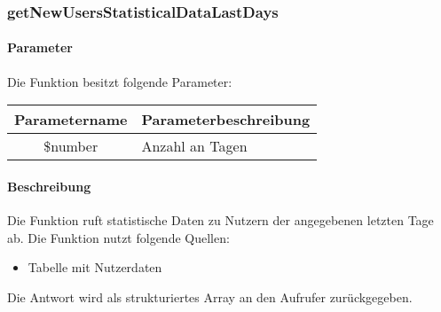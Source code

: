 \subsubsection{getNewUsersStatisticalDataLastDays}
\paragraph{Parameter} Die Funktion besitzt folgende Parameter:
\begin{table}[H]
	\begin{tabular}{|c|p{11cm}|}
		\hline
		\textbf{Parametername} & \textbf{Parameterbeschreibung} \\ \hline
		\$number & Anzahl an Tagen \\ \hline
	\end{tabular}
\end{table}
\paragraph{Beschreibung} Die Funktion ruft statistische Daten zu Nutzern der angegebenen letzten Tage ab. Die Funktion nutzt folgende Quellen:
\begin{itemize}
	\item Tabelle mit Nutzerdaten
\end{itemize}
Die Antwort wird als strukturiertes Array an den Aufrufer zurückgegeben.
